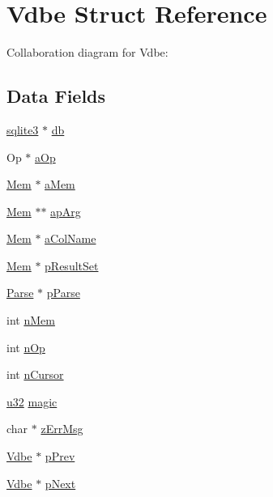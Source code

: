 \hypertarget{struct_vdbe}{}\section{Vdbe Struct Reference}
\label{struct_vdbe}


Collaboration diagram for Vdbe\+:
\subsection*{Data Fields}
\begin{DoxyCompactItemize}
\item 
\hyperlink{structsqlite3}{sqlite3} $\ast$ \hyperlink{struct_vdbe_ad6e663497d2c934364b3bcf07496b30b}{db}
\item 
Op $\ast$ \hyperlink{struct_vdbe_a174225cf156b2753600dd11eefc2c992}{a\+Op}
\item 
\hyperlink{struct_mem}{Mem} $\ast$ \hyperlink{struct_vdbe_adfd56f8b1cc1790601ff0940d884c200}{a\+Mem}
\item 
\hyperlink{struct_mem}{Mem} $\ast$$\ast$ \hyperlink{struct_vdbe_a5af1ceadb4cb7bde73c69b7f51a626bc}{ap\+Arg}
\item 
\hyperlink{struct_mem}{Mem} $\ast$ \hyperlink{struct_vdbe_a95e381528e23dabb12c0fc86ffec9928}{a\+Col\+Name}
\item 
\hyperlink{struct_mem}{Mem} $\ast$ \hyperlink{struct_vdbe_a879fc40450f639139fce2a774e02dd95}{p\+Result\+Set}
\item 
\hyperlink{struct_parse}{Parse} $\ast$ \hyperlink{struct_vdbe_ac700bf257b32cd7e491fde90a081379d}{p\+Parse}
\item 
int \hyperlink{struct_vdbe_a857d199d972b4d3864ce420c143508e4}{n\+Mem}
\item 
int \hyperlink{struct_vdbe_a33625b7205f0da4b73ec34d2d4aefd64}{n\+Op}
\item 
int \hyperlink{struct_vdbe_abd18ebaf2ce9128e5e45bd424af27002}{n\+Cursor}
\item 
\hyperlink{sqlite3_8c_a03ad5adfaeb9b7640dde78a0cc390319}{u32} \hyperlink{struct_vdbe_a1c2f2992893a71ac0ee3f43477000176}{magic}
\item 
char $\ast$ \hyperlink{struct_vdbe_a6fcf95fd4e53f09793171bd5b704ac9a}{z\+Err\+Msg}
\item 
\hyperlink{struct_vdbe}{Vdbe} $\ast$ \hyperlink{struct_vdbe_a75fede11b9093f9204a677c0d80fec8c}{p\+Prev}
\item 
\hyperlink{struct_vdbe}{Vdbe} $\ast$ \hyperlink{struct_vdbe_adee0b3608e49fbf227884d272fdcb86e}{p\+Next}
\item 
$$
\end{DoxyCompactItemize}
